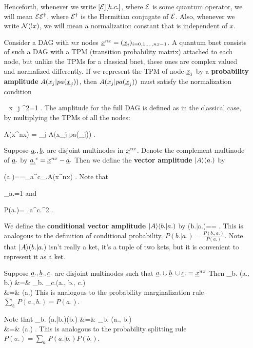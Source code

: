 \documentclass[12pt]{article}
\begin{document}
Henceforth,
whenever
we write
$[{\cal E}][h.c.]$,
where ${\cal E}$
is some quantum operator,
we will mean ${\cal E}{\cal E}^\dag$,
where ${\cal E}^\dag$
is the Hermitian conjugate
of ${\cal E}$.
Also, whenever
we write
${\cal N}(!x)$,
we will
mean a 
normalization
constant that is independent
of $x$.

Consider
a DAG with $nx$ nodes
${\underline{x}}^{nx}= ({\underline{x}}_i)_{i=0, 1, \ldots, nx-1}$.
A quantum bnet 
consists of such a DAG with 
a TPM (transition probability matrix)
attached to each node,
but unlike the TPMs for a classical bnet,
these ones are complex valued
and normalized differently.
If we represent the TPM
of node ${\underline{x}}_j$
by a {\bf probability 
amplitude} $A(x_j|pa({\underline{x}}_j))$,
then $A(x_j|pa({\underline{x}}_j))$ must satisfy
the normalization condition

\beq
\sum_{x_j}
^2=1
\;.
\eeq
The amplitude for the full
DAG is defined as in the classical
case, by multiplying
the TPMs of all the nodes:

\beq
A(x^{nx})
=
\prod_j A(x_j|pa(\rvx_j))
\;.
\eeq


Suppose
${\underline{a}}., {\underline{b}}.$ are disjoint multinodes 
in ${\underline{x}}^{nx}$. Denote
the complement
multinode of ${\underline{a}}.$ by
$\underline{a_.}^c={\underline{x}}^{nx}-{\underline{a}}.$ Then
we define
the {\bf vector amplitude} $|A\rangle(a.)$ by


\beq 
\A(a.)==\sum_{a^c_.}A(x^{nx})
\;.
\eeq
Note that

\beq
\sum_{a.}=1
\eeq
and

\beq
P(a.)=\sum_{a^c.}^2
\;.
\eeq



We define the {\bf conditional vector amplitude} $|A\rangle(b.|a.)$ by
\beq
\A(b.|a.)==
\;.
\eeq
This is analogous to the definition
of conditional
probability,
$P(b.|a.)=
\frac{P(b., a.)}{P(a.)}$.
Note that $|A\rangle(b.|a.)$
isn't really a ket, it's a tuple
of two kets, but it is convenient
to represent it as a ket.


Suppose ${\underline{a}}., {\underline{b}}., {\underline{c}}.$
are disjoint multinodes such that
${\underline{a}}.\cup{\underline{b}}.\cup{\underline{c}}.={\underline{x}}^{nx}$ Then
\beqa
\sum_{b.} \A(a., b.)
&=&
\sum_{b.} \sum_{c.}\A(a., b., c.)
\\
&=&
\A(a.)
\eeqa
This is analogous to the probability  marginalization 
rule $\sum_{b.}P(a., b.)=P(a.)$.

Note that
\beqa
\sum_{b.} \A(a.|b.)\A(b.)
&=&
\sum_{b.} \A(a., b.)
\\
&=&
\A(a.)
\;.
\eeqa
This
is analogous to
the  probability splitting rule $P(a.)=\sum_{b.}P(a.|b.)P(b.)$.
\end{document}
